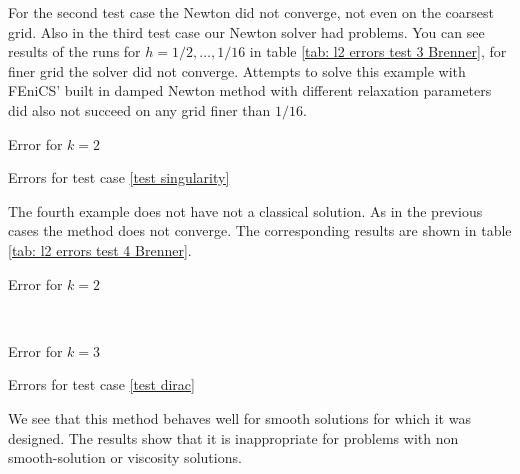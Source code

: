 For the second test case the Newton did not converge, not even on the coarsest grid. Also in the third test case our Newton solver had problems. You can see results of the runs for $h=1/2, \dots, 1/16$ in table \ref{tab: l2 errors test 3 Brenner}, for finer grid the solver did not converge. Attempts to solve this example with FEniCS' built in damped Newton method with different relaxation parameters did also not succeed on any grid finer than $1/16$.
\begin{table}[h]
		\centering
		\pgfplotstabletypeset[columns={iterations, l2error, h1error,N},
				    every row 0 column 0/.style={set content=init},
		]\MAThreeBrennerTwo
    	\caption{Error for $k=2$}
	\caption{Errors for test case \ref{test singularity}}
	\label{tab: l2 errors test 3 Brenner}
\end{table}

The fourth example does not have not a classical solution. As in the previous cases the method does not converge. The corresponding results are shown in table \ref{tab: l2 errors test 4 Brenner}.

\begin{table}[H]
	\begin{subtable}[b]{0.45\textwidth}
		\centering
		\pgfplotstabletypeset[columns={iterations, l2error, h1error,N},
				    every row 0 column 0/.style={set content=init},
				    columns/l2error/.style={ /pgf/number format/sci precision=6}     %
		]\MAFourBrennerTwo
    	\caption{Error for $k=2$}
   \end{subtable}
   ~
	\begin{subtable}[b]{0.45\textwidth}
		\centering
		\pgfplotstabletypeset[columns={iterations, l2error, h1error,N},
				    every row 0 column 0/.style={set content=init},
				    columns/l2error/.style={ /pgf/number format/sci precision=6}     %
		]\MAFourBrennerThree
 	\caption{Error for $k=3$}
	\end{subtable}
	\caption{Errors for test case \ref{test dirac}}
	\label{tab: l2 errors test 4 Brenner}
\end{table}


We see that this method behaves well for smooth solutions for which it was designed. The results show that it is inappropriate for problems with non smooth-solution or viscosity solutions.

